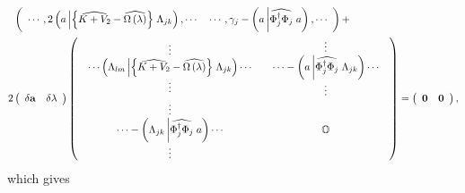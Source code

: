 \documentclass[aps,preprint]{revtex4}%
\begin{document}
\begin{align}
&  \left(
\begin{array}
[c]{cc}%
\cdots,2\left(  a\left\vert \left\{  \widehat{K+V_{2}}-\widehat{\Omega\left(
\lambda\right)  }\right\}  \right.  \Lambda_{jk}\right)  ,\cdots &
\cdots,\gamma_{j}-\left(  a\left\vert \widehat{\Phi_{j}^{\dagger}\Phi_{j}%
}\right.  a\right)  ,\cdots
\end{array}
\right)  +\nonumber\\
2  &  \left(
\begin{array}
[c]{cc}%
\delta\mathbf{a} & \delta\mathbf{\lambda}%
\end{array}
\right)  \left(
\begin{array}
[c]{cc}%
\begin{array}
[c]{c}%
\vdots\\
\cdots\left(  \Lambda_{lm}\left\vert \left\{  \widehat{K+V_{2}}%
-\widehat{\Omega\left(  \lambda\right)  }\right\}  \right.  \Lambda
_{jk}\right)  \cdots\\
\vdots
\end{array}
&
\begin{array}
[c]{c}%
\vdots\\
\cdots-\left(  a\left\vert \widehat{\Phi_{j}^{\dagger}\Phi_{j}}\right.
\Lambda_{jk}\right)  \cdots\\
\vdots
\end{array}
\\%
\begin{array}
[c]{c}%
\vdots\\
\cdots-\left(  \Lambda_{jk}\left\vert \widehat{\Phi_{j}^{\dagger}\Phi_{j}%
}\right.  a\right)  \cdots\\
\vdots
\end{array}
& \mathbb{O}%
\end{array}
\right)  =\left(
\begin{array}
[c]{cc}%
\mathbf{0} & \mathbf{0}%
\end{array}
\right)  \mathbf{,}%
\end{align}
which gives%
\end{document}
